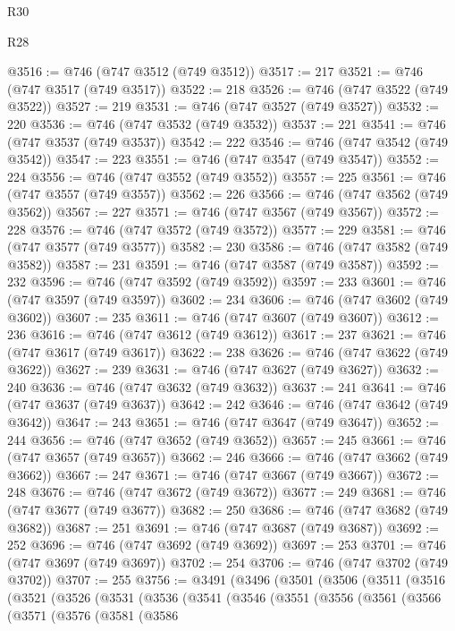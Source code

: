 \begin{lexlean}{R30}
\begin{lexlean}{R28}
\begin{coremodule}
{{{{{{{{{{{{{{{{{{{{{{{{{{{{{{{{{{{{{{{{{{{{{{{{{{{{{{{{{{{{{{{{{{{{{{{{{{{{{{{{{{{{{{{{{{{{{{{{{{{{{{{{{{{{{{{{{{{{{{{{{{{{{{{{{{{{{{{{{{{{{{{@3516 := @746 (@747 @3512 (@749 @3512))
@3517 := 217
@3521 := @746 (@747 @3517 (@749 @3517))
@3522 := 218
@3526 := @746 (@747 @3522 (@749 @3522))
@3527 := 219
@3531 := @746 (@747 @3527 (@749 @3527))
@3532 := 220
@3536 := @746 (@747 @3532 (@749 @3532))
@3537 := 221
@3541 := @746 (@747 @3537 (@749 @3537))
@3542 := 222
@3546 := @746 (@747 @3542 (@749 @3542))
@3547 := 223
@3551 := @746 (@747 @3547 (@749 @3547))
@3552 := 224
@3556 := @746 (@747 @3552 (@749 @3552))
@3557 := 225
@3561 := @746 (@747 @3557 (@749 @3557))
@3562 := 226
@3566 := @746 (@747 @3562 (@749 @3562))
@3567 := 227
@3571 := @746 (@747 @3567 (@749 @3567))
@3572 := 228
@3576 := @746 (@747 @3572 (@749 @3572))
@3577 := 229
@3581 := @746 (@747 @3577 (@749 @3577))
@3582 := 230
@3586 := @746 (@747 @3582 (@749 @3582))
@3587 := 231
@3591 := @746 (@747 @3587 (@749 @3587))
@3592 := 232
@3596 := @746 (@747 @3592 (@749 @3592))
@3597 := 233
@3601 := @746 (@747 @3597 (@749 @3597))
@3602 := 234
@3606 := @746 (@747 @3602 (@749 @3602))
@3607 := 235
@3611 := @746 (@747 @3607 (@749 @3607))
@3612 := 236
@3616 := @746 (@747 @3612 (@749 @3612))
@3617 := 237
@3621 := @746 (@747 @3617 (@749 @3617))
@3622 := 238
@3626 := @746 (@747 @3622 (@749 @3622))
@3627 := 239
@3631 := @746 (@747 @3627 (@749 @3627))
@3632 := 240
@3636 := @746 (@747 @3632 (@749 @3632))
@3637 := 241
@3641 := @746 (@747 @3637 (@749 @3637))
@3642 := 242
@3646 := @746 (@747 @3642 (@749 @3642))
@3647 := 243
@3651 := @746 (@747 @3647 (@749 @3647))
@3652 := 244
@3656 := @746 (@747 @3652 (@749 @3652))
@3657 := 245
@3661 := @746 (@747 @3657 (@749 @3657))
@3662 := 246
@3666 := @746 (@747 @3662 (@749 @3662))
@3667 := 247
@3671 := @746 (@747 @3667 (@749 @3667))
@3672 := 248
@3676 := @746 (@747 @3672 (@749 @3672))
@3677 := 249
@3681 := @746 (@747 @3677 (@749 @3677))
@3682 := 250
@3686 := @746 (@747 @3682 (@749 @3682))
@3687 := 251
@3691 := @746 (@747 @3687 (@749 @3687))
@3692 := 252
@3696 := @746 (@747 @3692 (@749 @3692))
@3697 := 253
@3701 := @746 (@747 @3697 (@749 @3697))
@3702 := 254
@3706 := @746 (@747 @3702 (@749 @3702))
@3707 := 255
@3756 := @3491
    (@3496
      (@3501
        (@3506
          (@3511
            (@3516
              (@3521
                (@3526
                  (@3531
                    (@3536
                      (@3541
                        (@3546
                          (@3551
                            (@3556
                              (@3561
                                (@3566
                                  (@3571
                                    (@3576
                                      (@3581
                                        (@3586
}}}}}}}}}}}}}}}}}}}}}}}}}}}}}}}}}}}}}}}}}}}}}}}}}}}}}}}}}}}}}}}}}}}}}}}}}}}}}}}}}}}}}}}}}}}}}}}}}}}}}}}}}}}}}}}}}}}}}}}}}}}}}}}}}}}}}}}}}}}}}}}
\end{coremodule}
\end{lexlean}
\end{lexlean}
